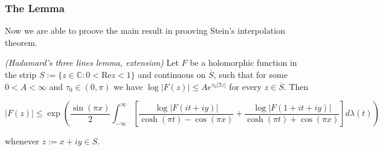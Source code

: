 \subsubsection{The Lemma}
Now we are able to proove the main result in prooving Stein's interpolation theorem.

\vspace{2mm}

\begin{mdframed}
	\begin{lemma}\emph{(Hadamard's three lines lemma, extension)}
		Let $F$ be a holomorphic function in the strip $S := \{z \in \mathbb{C}: 0 < \mathrm{Re}z < 1\}$ and continuous on $\overline{S}$, such that for some $0 < A < \infty$ and $\tau_0 \in (0,\pi)$ we have $\log \vert F(z)\vert \leqslant A e^{\tau_0 \vert \Im z \vert}$ for every $z \in \overline{S}$. Then

			\begin{equation*}
				\vert F(z) \vert \leqslant \exp\left( \frac{\sin(\pi x)}{2} \int_{-\infty}^\infty \left[ \frac{\log \vert F(it + iy)\vert}{\cosh(\pi t) - \cos(\pi x)} + \frac{\log \vert F(1 + it + iy)\vert}{\cosh(\pi t) + \cos(\pi x)} \right] d\lambda(t)\right)
			\end{equation*}

			whenever $z := x + iy \in S$.
			\label{lem:EHTL}
	\end{lemma}
\end{mdframed}


